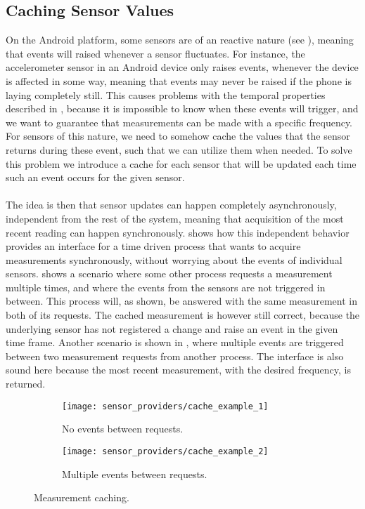 \subsection{Caching Sensor Values}
\label{sub:caching_sensor_values}
On the Android platform, some sensors are of an reactive nature (see ), meaning that events will raised whenever a sensor fluctuates. For instance, the accelerometer sensor in an Android device only raises events, whenever the device is affected in some way, meaning that events may never be raised if the phone is laying completely still. This causes problems with the temporal properties described in , because it is impossible to know when these events will trigger, and we want to guarantee that measurements can be made with a specific frequency. For sensors of this nature, we need to somehow cache the values that the sensor returns during these event, such that we can utilize them when needed. To solve this problem we introduce a cache for each sensor that will be updated each time such an event occurs for the given sensor.
\\\\
The idea is then that sensor updates can happen completely asynchronously, independent from the rest of the system, meaning that acquisition of the most recent reading can happen synchronously.  shows how this independent behavior provides an interface for a time driven process that wants to acquire measurements synchronously, without worrying about the events of individual sensors.  shows a scenario where some other process requests a measurement multiple times, and where the events from the sensors are not triggered in between. This process will, as shown, be answered with the same measurement in both of its requests. The cached measurement is however still correct, because the underlying sensor has not registered a change and raise an event in the given time frame. Another scenario is shown in , where multiple events are triggered between two measurement requests from another process. The interface is also sound here because the most recent measurement, with the desired frequency, is returned.

\begin{figure}[!htbp]
\begin{subfigure}[!t]{.5\textwidth}
  \centering
  \texttt{[image: sensor\_providers/cache\_example\_1]}
  \caption{No events between requests.}
  \label{fig:cache_no_event_between}
\end{subfigure}
\begin{subfigure}[!t]{.5\textwidth}
  \centering
  \texttt{[image: sensor\_providers/cache\_example\_2]}
  \caption{Multiple events between requests.}
  \label{fig:cache_multiple_event_between}
\end{subfigure}
\caption{Measurement caching.}
\label{fig:cache_examples}
\end{figure}
\FloatBarrier

